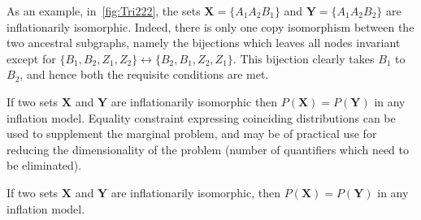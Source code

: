 As an example, in~\cref{fig:Tri222}, the sets $\bm{X}=\{A_1 A_2 B_1\}$ and $\bm{Y}=\{A_1 A_2 B_2\}$ are inflationarily isomorphic. Indeed, there is only one copy isomorphism between the two ancestral subgraphs, namely the bijections which leaves all nodes invariant except for $\{B_1,B_2,Z_1,Z_2\}\leftrightarrow\{B_2,B_1,Z_2,Z_1\}$. This bijection clearly takes $B_1$ to $B_2$, and hence both the requisite conditions are met.

 If two sets $\bm{X}$ and $\bm{Y}$ are inflationarily isomorphic then $P(\bm{X}) = P(\bm{Y})$ in any inflation model. 
Equality constraint expressing coinciding distributions can be used to supplement the marginal problem, and may be of practical use for reducing the dimensionality of the problem (number of quantifiers which need to be eliminated). 


If two sets $\bm{X}$ and $\bm{Y}$ are inflationarily isomorphic, then $P(\bm{X}) = P(\bm{Y})$ in any inflation model.


